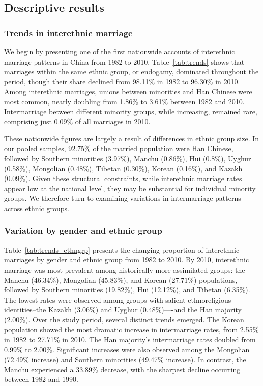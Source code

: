 \subsection{Descriptive results}

\subsubsection{Trends in interethnic marriage}



We begin by presenting one of the first nationwide accounts of interethnic
marriage patterns in China from 1982 to 2010.
Table~\ref{tab:trends} shows that marriages within the same ethnic group, or
endogamy, dominated throughout the period, though their share declined from
98.11\% in 1982 to 96.30\% in 2010.
Among interethnic marriages, unions between minorities and Han Chinese were most
common, nearly doubling from 1.86\% to 3.61\% between 1982 and 2010.
Intermarriage between different minority groups, while increasing, remained
rare, comprising just 0.09\% of all marriages in 2010.

These nationwide figures are largely a result of differences in ethnic group
size.
In our pooled samples, 92.75\% of the married population were Han Chinese,
followed by Southern minorities (3.97\%), Manchu (0.86\%), Hui (0.8\%),
Uyghur (0.58\%), Mongolian (0.48\%), Tibetan (0.30\%), Korean (0.16\%), and
Kazakh (0.09\%).
Given these structural constraints, while interethnic marriage rates appear low
at the national level, they may be substantial for individual minority groups.
We therefore turn to examining variations in intermarriage patterns across
ethnic groups.

\subsubsection{Variation by gender and ethnic group}



Table~\ref{tab:trends_ethngrp} presents the changing proportion of interethnic
marriages by gender and ethnic group from 1982 to 2010.
By 2010, interethnic marriage was most prevalent among historically more
assimilated groups: the Manchu (46.34\%), Mongolian (45.83\%), and Korean
(27.71\%) populations, followed by Southern minorities (19.82\%), Hui (12.12\%),
and Tibetan (6.35\%).
The lowest rates were observed among groups with salient ethnoreligious
identities--the Kazakh (3.06\%) and Uyghur (0.48\%)—-and the Han majority
(2.00\%).
Over the study period, several distinct trends emerged.
The Korean population showed the most dramatic increase in intermarriage rates,
from 2.55\% in 1982 to 27.71\% in 2010.
The Han majority's intermarriage rates doubled from 0.99\% to 2.00\%.
Significant increases were also observed among the Mongolian (72.49\% increase)
and Southern minorities (49.47\% increase).
In contrast, the Manchu experienced a 33.89\% decrease, with the sharpest
decline occurring between 1982 and 1990.

